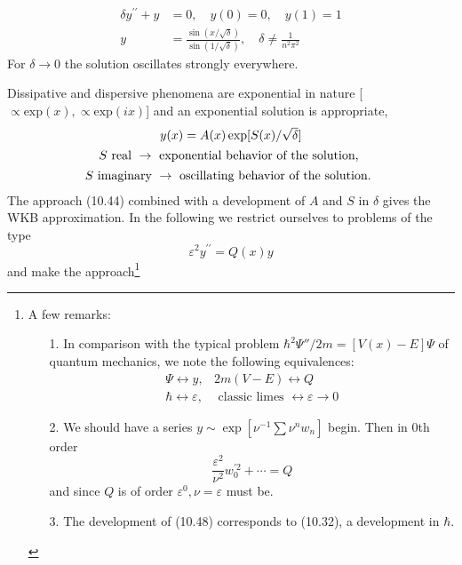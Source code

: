 \begin{equation}
\begin{aligned} \delta y^{\prime \prime}+y &=0, \quad y(0)=0, \quad y(1)=1 \\ y &=\frac{\sin (x / \sqrt{\delta})}{\sin (1 / \sqrt{\delta})}, \quad \delta \neq \frac{1}{n^{2} \pi^{2}} \end{aligned}
\end{equation}
For $\delta\rightarrow 0$ the solution oscillates strongly everywhere.\par
Dissipative and dispersive phenomena are exponential in nature [$\propto \text{exp}(x),\propto\text{exp}(ix)$] and an exponential solution is appropriate,
\begin{equation}
\begin{array}{c}{y(x)=A(x) \exp [S(x) / \sqrt{\delta}]} \vspace{1ex}\\ {S \text { real } \rightarrow \text { exponential behavior of the solution, }} \vspace{1ex}\\ {S \text { imaginary } \rightarrow \text { oscillating behavior of the solution. }}\end{array}
\end{equation}
The approach (10.44) combined with a development of $A$ and $S$ in $\delta$ gives the WKB approximation. In the following we restrict ourselves to problems of the type
\begin{equation}
    \varepsilon^{2} y^{\prime \prime}=Q(x) y
    \end{equation}
and make the approach\footnote{
    A few remarks:
    {\footnotesize{
    \begin{enumerate}
        \item[1.] In comparison with the typical problem $\hbar^2\Psi''/ 2m = [V (x) - E] \Psi$ of quantum mechanics, we note the following equivalences:
            \begin{equation}
                \begin{array}{ll}{\Psi \leftrightarrow y,} & {2 m(V-E) \leftrightarrow Q} \\ {\hbar \leftrightarrow \varepsilon,} & {\text { classic limes } \leftrightarrow \varepsilon \rightarrow 0}\end{array}
            \end{equation} 
        \item[2.] We should have a series $y\sim\operatorname{exp}[\nu^{-1}\sum\nu^nw_n]$
        begin. Then in 0th order
            \begin{equation}
                \frac{\varepsilon^{2}}{\nu^{2}} w_{0}^{\prime 2}+\cdots=Q
            \end{equation}and since $Q$ is of order $\varepsilon^0, \nu=\varepsilon$ must be.
        \item[3.] The development of (10.48) corresponds to (10.32), a development in $\hbar$.
    \end{enumerate}}}
}
